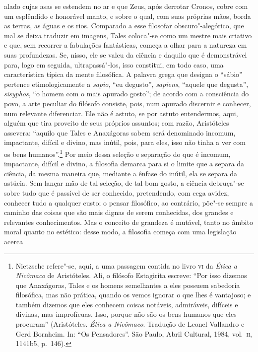 alado cujas asas se estendem no ar e que Zeus, após derrotar Cronos, cobre
com um esplêndido e honorável manto, e sobre o qual, com suas próprias mãos,
borda as terras, as águas e os rios. Comparado a esse filosofar
obscuro"-alegórico, que mal se deixa traduzir em imagens, Tales coloca"-se
como um mestre mais criativo e que, sem recorrer a fabulações fantásticas,
começa a olhar para a natureza em suas profundezas. Se, nisso, ele se valeu
da ciência e daquilo que é demonstrável para, logo em seguida,
ultrapassá"-los, isso constitui, em todo caso, uma característica típica da
mente filosófica. A palavra grega que designa o ``sábio'' pertence
etimologicamente a \textit{sapio}, ``eu degusto'', \textit{sapiens}, ``aquele
que degusta'', \textit{sisyphos}, ``o homem com o mais apurado gosto''; de acordo com a
 consciência do povo, a arte peculiar do filósofo consiste, pois, num apurado
 discernir e conhecer, num relevante diferenciar. Ele não é astuto, se por
 astuto entendermos, aqui, alguém que tira proveito de seus próprios
 assuntos; com razão, Aristóteles assevera: ``aquilo que Tales e Anaxágoras
 sabem será denominado incomum, impactante, difícil e divino, mas inútil,
 pois, para eles, isso não tinha a ver com os bens humanos''.\footnote{Nietzsche 
 refere"-se, aqui, a uma passagem contida no livro \textsc{vi} da 
 \textit{Ética a Nicômaco} de Aristóteles. Ali, o filósofo Estagirita
 escreve: ``Por isso dizemos que Anaxágoras, Tales e os homens semelhantes a
 eles possuem sabedoria filosófica, mas não prática, quando os vemos ignorar
 o que lhes é vantajoso; e também dizemos que eles conhecem coisas notáveis,
 admiráveis, difíceis e divinas, mas improfícuas. Isso, porque não são os
 bens humanos que eles procuram'' (Aristóteles. \textit{Ética a Nicômaco}.
 Tradução de Leonel Vallandro e Gerd Bornheim. In: ``Os Pensadores''. São
 Paulo, Abril Cultural, 1984, vol.~\textsc{ii}, 1141b5, p.~146).} Por meio
 dessa seleção e separação do que é incomum, impactante, difícil e divino, a
 filosofia demarca para si o limite que a separa da ciência, da mesma maneira
 que, mediante a ênfase do inútil, ela se separa da astúcia. Sem lançar mão
 de tal seleção, de tal bom gosto, a ciência debruça"-se sobre tudo que é
 passível de ser conhecido, pretendendo, com cega avidez, conhecer tudo a
 qualquer custo; o pensar filosófico, ao contrário, põe"-se sempre a caminho
 das coisas que são mais dignas de serem conhecidas, dos grandes e relevantes
 conhecimentos. Mas o conceito de grandeza é mutável, tanto no âmbito moral
 quanto no estético: desse modo, a filosofia começa com uma legislação acerca

